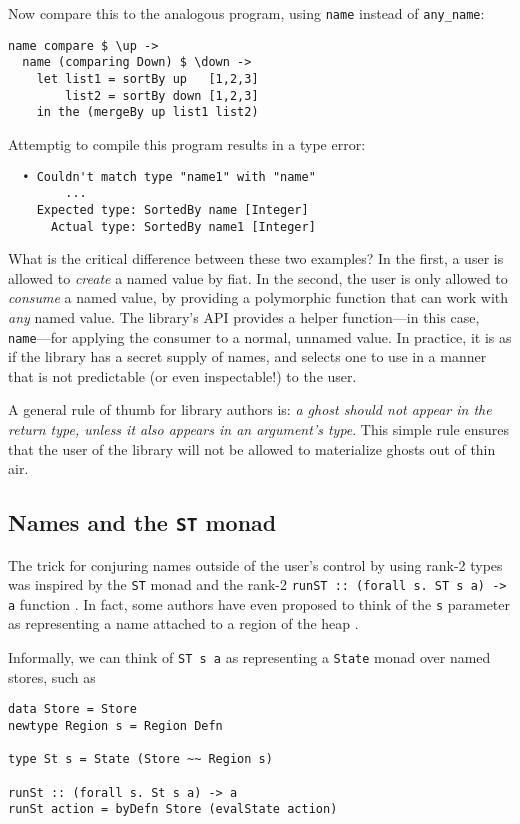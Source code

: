 \documentclass[format=sigplan, review=false, screen=true]{acmart}
\begin{document}
Now compare this to the analogous program, using \texttt{name} instead of \texttt{any\_name}:
\begin{verbatim}
name compare $ \up ->
  name (comparing Down) $ \down ->
    let list1 = sortBy up   [1,2,3]
        list2 = sortBy down [1,2,3]
    in the (mergeBy up list1 list2)
\end{verbatim}
\noindent
Attemptig to compile this program results in a type error:

\begin{lstlisting}
  • Couldn't match type "name1" with "name"
        ...
    Expected type: SortedBy name [Integer]
      Actual type: SortedBy name1 [Integer]
\end{lstlisting}
\noindent
What is the critical difference between these two examples? In the first, a user is
allowed to \emph{create} a named value by fiat. In the second, the user is only allowed to \emph{consume} a named value, by
providing a polymorphic function that can work with \emph{any} named value. The library's API provides
a helper function---in this case, \texttt{name}---for applying the consumer to a normal, unnamed value.
In practice, it is as if the
library has a secret supply of names, and selects one to use in a manner that is not
predictable (or even inspectable!) to the user.

A general rule of thumb for library authors is:
\emph{a ghost should not appear in the return type,  unless it also appears in an argument's type}. This simple rule ensures that
the user of the library will not be allowed to materialize ghosts out of thin air.

\subsection{Names and the \texttt{ST} monad}
The trick for conjuring names outside of the user's control by using rank-2 types was
inspired by the \texttt{ST} monad and the rank-2 \texttt{runST :: (forall s. ST s a) -> a}
function \cite{launchbury1994lazy}. In fact, some authors have even proposed to think of the \texttt{s} parameter as
representing a name attached to a region of the heap \citep{timany2017logical}.

Informally, we can think of \texttt{ST s a} as representing a \texttt{State} monad over
named stores, such as
\begin{verbatim}
data Store = Store
newtype Region s = Region Defn

type St s = State (Store ~~ Region s)

runSt :: (forall s. St s a) -> a
runSt action = byDefn Store (evalState action)
\end{verbatim}
\end{document}
